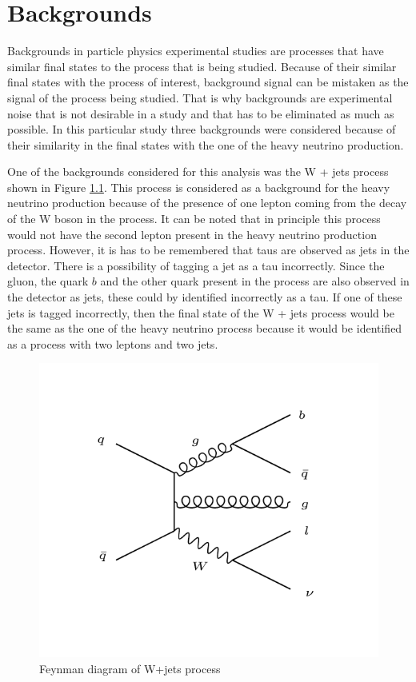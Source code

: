 \graphicspath{{Backgrounds/Figures/}}

\chapter{Backgrounds}

Backgrounds in particle physics experimental studies are processes that have similar final states to the process that is being studied. Because of their similar final states with the process of interest, background signal can be mistaken as the signal of the process being studied. That is why backgrounds are experimental noise that is not desirable in a study and that has to be eliminated as much as possible. In this particular study three backgrounds were considered because of their similarity in the final states with the one of the heavy neutrino production. 

One of the backgrounds considered for this analysis was the W + jets process shown in Figure \ref{fig: Wjets_background}. This process is considered as a background for the heavy neutrino production because of the presence of one lepton coming from the decay of the W boson in the process. It can be noted that in principle this process would not have the second lepton present in the heavy neutrino production process. However, it is has to be remembered that taus are observed as jets in the detector. There is a possibility of tagging a jet as a tau incorrectly. Since the gluon, the quark $b$ and the other quark present in the process are also observed in the detector as jets, these could by identified incorrectly as a tau. If one of these jets is tagged incorrectly, then the final state of the W + jets process would be the same as the one of the heavy neutrino process because it would be identified as a process with two leptons and two jets. 

\begin{figure}[H]
\centering
\includegraphics[width = \linewidth]{Wjets}
\caption{Feynman diagram of W+jets process}
\label{fig: Wjets_background}
\end{figure}



